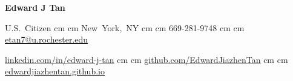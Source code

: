 \begin{header}
    \textbf{\fontsize{24pt}{24pt}\selectfont Edward J Tan}


    \normalsize
    \mbox{U.S. Citizen}%
     cm%
    \AND%
     cm%
    \mbox{New York, NY}%
     cm%
    \AND%
     cm%
    \mbox{669-281-9748}%
     cm%
    \AND%
     cm%
    \mbox{\href{mailto:etan7@u.rochester.edu}{etan7@u.rochester.edu}}%

    \vspace{-0.15 cm}

    \mbox{\underline{\href{https://linkedin.com/in/edward-j-tan}{linkedin.com/in/edward-j-tan}}}%
     cm%
    \AND%
     cm%
    \mbox{\underline{\href{https://github.com/EdwardJiazhenTan}{github.com/EdwardJiazhenTan}}}%
     cm%
    \AND%
     cm%
    \mbox{\underline{\href{https://edwardjiazhentan.github.io/}{edwardjiazhentan.github.io}}}%
\end{header}
